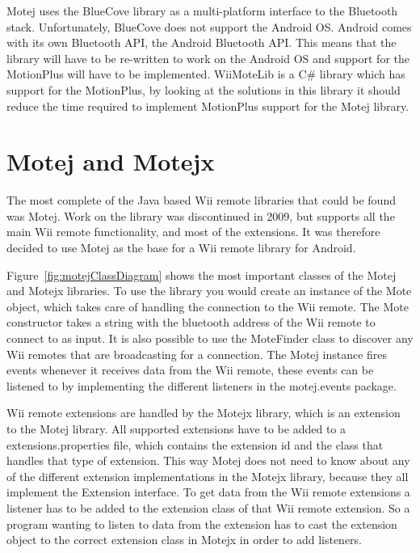 Motej uses the BlueCove library as a multi-platform interface to the Bluetooth stack. Unfortunately, BlueCove does not support the Android OS. Android comes with its own Bluetooth API, the Android Bluetooth API. This means that the library will have to be re-written to work on the Android OS and support for the MotionPlus will have to be implemented. WiiMoteLib\cite{wiiMoteLib} is a C\# library which has support for the MotionPlus, by looking at the solutions in this library it should reduce the time required to implement MotionPlus support for the Motej library.

\section{Motej and Motejx}
The most complete of the Java based Wii remote libraries that could be found was Motej. Work on the library was discontinued in 2009, but supports all the main Wii remote functionality, and most of the extensions. It was therefore decided to use Motej as the base for a Wii remote library for Android. 

Figure~\ref{fig:motejClassDiagram} shows the most important classes of the Motej and Motejx libraries. To use the library you would create an instance of the Mote object, which takes care of handling the connection to the Wii remote. The Mote constructor takes a string with the bluetooth address of the Wii remote to connect to as input. It is also possible to use the MoteFinder class to discover any Wii remotes that are broadcasting for a connection. The Motej instance fires events whenever it receives data from the Wii remote, these events can be listened to by implementing the different listeners in the motej.events package. 

Wii remote extensions are handled by the Motejx library, which is an extension to the Motej library. All supported extensions have to be added to a extensions.properties file, which contains the extension id and the class that handles that type of extension. This way Motej does not need to know about any of the different extension implementations in the Motejx library, because they all implement the Extension interface. To get data from the Wii remote extensions a listener has to be added to the extension class of that Wii remote extension. So a program wanting to listen to data from the extension has to cast the extension object to the correct extension class in Motejx in order to add listeners.


